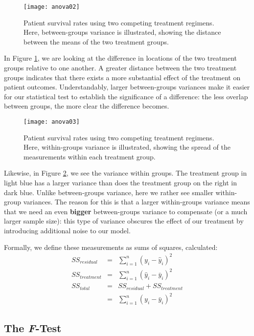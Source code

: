 \begin{figure}[htp]
\texttt{[image: anova02]}
\caption{Patient survival rates using two competing treatment regimens. Here, between-groups variance is illustrated, showing the distance between the means of the two treatment groups.}
\label{fig:anova02}
\end{figure}

In Figure \ref{fig:anova02}, we are looking at the difference in locations of the two treatment groups relative to one another. A greater distance between the two treatment groups indicates that there exists a more substantial effect of the treatment on patient outcomes. Understandably, larger between-groups variances make it easier for our statistical test to establish the significance of a difference: the less overlap between groups, the more clear the difference becomes.

\begin{figure}[htp]
\texttt{[image: anova03]}
\caption{Patient survival rates using two competing treatment regimens. Here, within-groups variance is illustrated, showing the spread of the measurements within each treatment group.}
\label{fig:anova03}
\end{figure}

Likewise, in Figure \ref{fig:anova03}, we see the variance within groups. The treatment group in light blue has a larger variance than does the treatment group on the right in dark blue. Unlike between-groups variance, here we rather see smaller within-group variances. The reason for this is that a larger within-groups variance means that we need an even \textbf{bigger} between-groups variance to compensate (or a much larger sample size): this type of variance obscures the effect of our treatment by introducing additional noise to our model.

Formally, we define these measurements as sums of squares, calculated:
\begin{eqnarray*}
SS_{residual} &=& \sum_{i=1}^n \left(y_i - \hat{y}_i\right)^2 \\
SS_{treatment} &=& \sum_{i=1}^n \left(\hat{y}_i-\bar{y}_i\right)^2 \\
SS_{total} &=& SS_{residual}+SS_{treatment} \\
&=& \sum_{i=1}^n\left(y_i-\bar{y}_i\right)^2
\end{eqnarray*}

\subsection{The \textit{F}-Test}

